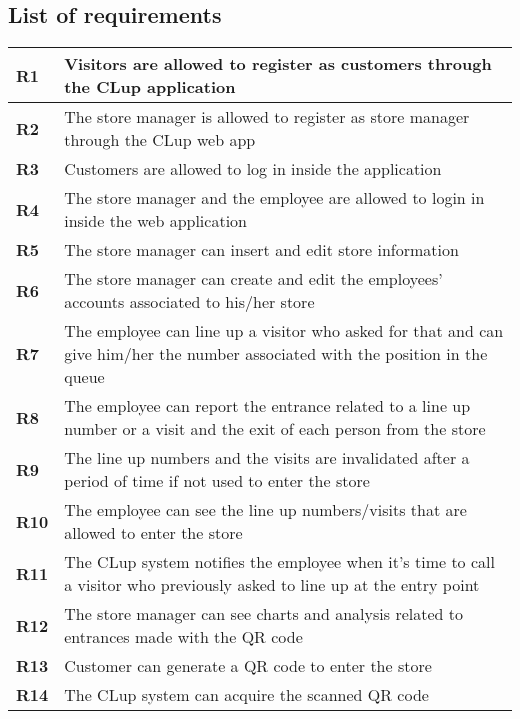 \subsection{List of requirements}
\begin{center}
    {\renewcommand{\arraystretch}{2}%
    \begin{longtable}{L{2cm}L{12cm}}
        \hline
        \textbf{R1} & Visitors are allowed to register as customers through the CLup application \\
        \hline
        \textbf{R2} & The store manager is allowed to register as store manager through the CLup web app \\
        \hline
        \textbf{R3} & Customers are allowed to log in inside the application \\
        \hline
        \textbf{R4} & The store manager and the employee are allowed to login in inside the web application \\
        \hline
        \textbf{R5} & The store manager can insert and edit store information \\
        \hline
        \textbf{R6} & The store manager can create and edit the employees' accounts associated to his/her store \\
        \hline
        \textbf{R7} & The employee can line up a visitor who asked for that and can give him/her the number associated with the position in the queue \\
        \hline
        \textbf{R8} & The employee can report the entrance related to a line up number or a visit and the exit of each person from the store \\
        \hline
        \textbf{R9} & The line up numbers and the visits are invalidated after a period of time if not used to enter the store \\
        \hline
        \textbf{R10} & The employee can see the line up numbers/visits that are allowed to enter the store \\
        \hline
        \textbf{R11} & The CLup system notifies the employee when it's time to call a visitor who previously asked to line up at the entry point \\
        \hline
        \textbf{R12} & The store manager can see charts and analysis related to entrances made with the QR code \\
        \hline
        \textbf{R13} & Customer can generate a QR code to enter the store \\
        \hline
        \textbf{R14} & The CLup system can acquire the scanned QR code \\

\end{longtable}}
\end{center}
